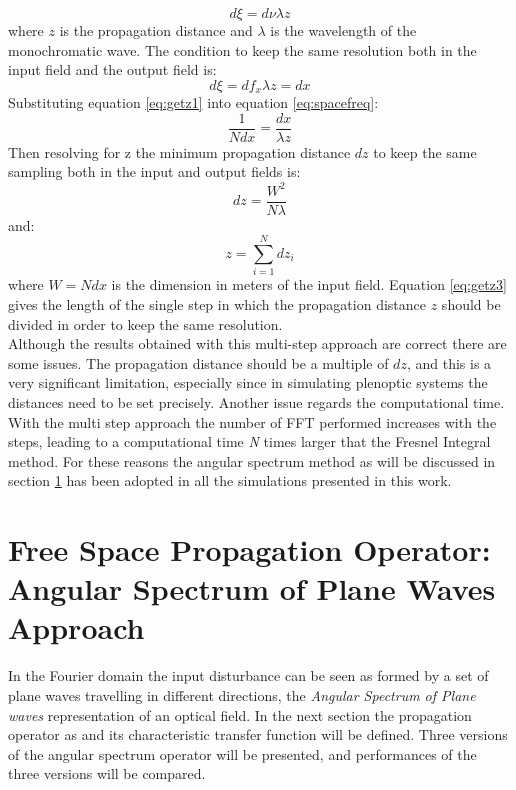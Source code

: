 \begin{equation}
\label{eq:pixelsize}
d\xi=d\nu\lambda z
\end{equation} 
where $z$ is the propagation distance and $\lambda$ is the wavelength of the monochromatic wave. The condition to keep the same resolution both in the input field and the output field is:
\begin{equation}
\label{eq:getz}
d\xi=df_x\lambda z=dx
\end{equation}
Substituting equation \ref{eq:getz1} into equation \ref{eq:spacefreq}:
\begin{equation}
\label{eq:getz2}
\dfrac{1}{Ndx}=\frac{dx}{\lambda z}
\end{equation}
Then resolving for z the minimum propagation distance $dz$ to keep the same sampling both in the input and output fields is:
\begin{equation}
\label{eq:getz3}
dz=\frac{W^2}{N\lambda }
\end{equation}
and:
\begin{equation}
	\label{eq:getz4}
	z=\displaystyle\sum_{i=1}^{N} dz_i
\end{equation}
where $W=Ndx$ is the dimension in meters of the input field. Equation \ref{eq:getz3} gives the length of the single step in which the propagation distance $z$ should be divided in order to keep the same resolution.\\ Although the results obtained with this multi-step approach are correct there are some issues. The propagation distance should be a multiple of $dz $, and this is a very significant limitation, especially since in simulating plenoptic systems the distances need to be set precisely. Another issue regards the computational time. With the multi step approach the number of FFT performed increases with the steps, leading to a computational time \textit{N} times larger that the Fresnel Integral method. For these reasons the angular spectrum method as will be discussed in section \ref{sec:angular} has been adopted in all the simulations presented in this work. 
\section {Free Space Propagation Operator: Angular Spectrum of Plane Waves Approach}
\label{sec:angular}
 In the Fourier domain the input disturbance can be seen as formed by a set of plane waves travelling in different directions, the \textit{Angular Spectrum of Plane waves} representation of an optical field. In the next section the propagation operator as and its characteristic transfer function will be defined. Three versions of the angular spectrum operator will be presented, and performances of the three versions will be compared.
